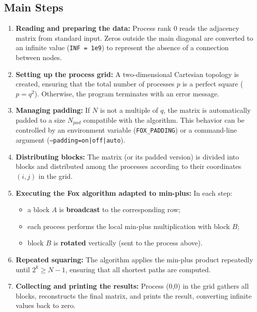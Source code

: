 \documentclass[10pt,a4paper]{article}
\begin{document}
\subsection{Main Steps}
\begin{enumerate}
  \item \textbf{Reading and preparing the data:}  
  Process rank 0 reads the adjacency matrix from standard input. Zeros outside the main diagonal are converted to an infinite value (\texttt{INF = 1e9}) to represent the absence of a connection between nodes.

  \item \textbf{Setting up the process grid:}  
  A two-dimensional Cartesian topology is created, ensuring that the total number of processes \(p\) is a perfect square (\(p = q^2\)). Otherwise, the program terminates with an error message.

  \item \textbf{Managing padding:}  
  If \(N\) is not a multiple of \(q\), the matrix is automatically padded to a size \(N_{pad}\) compatible with the algorithm. This behavior can be controlled by an environment variable (\texttt{FOX\_PADDING}) or a command-line argument (\texttt{--padding=on|off|auto}).

  \item \textbf{Distributing blocks:}  
  The matrix (or its padded version) is divided into blocks and distributed among the processes according to their coordinates \((i, j)\) in the grid.

  \item \textbf{Executing the Fox algorithm adapted to min-plus:}  
  In each step:
  \begin{itemize}
    \item a block \(A\) is \textbf{broadcast} to the corresponding row;
    \item each process performs the local min-plus multiplication with block \(B\);
    \item block \(B\) is \textbf{rotated} vertically (sent to the process above).
  \end{itemize}

  \item \textbf{Repeated squaring:}  
  The algorithm applies the min-plus product repeatedly until \(2^k \geq N - 1\), ensuring that all shortest paths are computed.

  \item \textbf{Collecting and printing the results:}  
  Process (0,0) in the grid gathers all blocks, reconstructs the final matrix, and prints the result, converting infinite values back to zero.
\end{enumerate}
\end{document}
